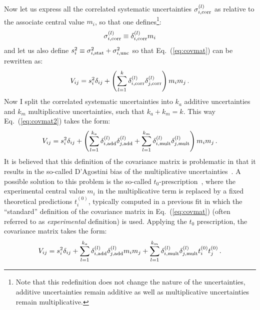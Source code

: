 \documentclass[10pt,a4paper]{article}
\begin{document}
Now let us express all the correlated systematic uncertainties
$\sigma_{i,\rm corr}^{(l)}$ as relative to the associate central value
$m_i$, so that one defines\footnote{Note that this redefinition does
  not change the nature of the uncertainties, additive uncertainties
  remain additive as well as multiplicative uncertainties remain
  multiplicative.}:
\begin{equation}
\sigma_{i,\rm corr}^{(l)}\equiv  \delta_{i,\rm corr}^{(l)} m_i
\end{equation}
and let us also define
$s_i^2\equiv \sigma_{i,\rm stat}^2 +\sigma_{i,\rm unc}^2$ so that
Eq.~(\ref{eq:covmat}) can be rewritten as:
\begin{equation}\label{eq:covmat2}
  V_{ij}=s_i^2\delta_{ij} + \left(\sum_{l=1}^{k}\delta_{i,\rm
    corr}^{(l)}\delta_{j,\rm
    corr}^{(l)}\right)m_im_j\,.
\end{equation}
Now I split the correlated systematic uncertainties into $k_a$
additive uncertainties and $k_m$ multiplicative uncertainties, such
that $k_a+k_m=k$. This way Eq.~(\ref{eq:covmat2}) takes the form:
\begin{equation}\label{eq:covmat3}
  V_{ij}=s_i^2\delta_{ij} + \left(\sum_{l=1}^{k_a}\delta_{i,\rm
    add}^{(l)}\delta_{j,\rm
    add}^{(l)}+\sum_{l=1}^{k_m}\delta_{i,\rm
    mult}^{(l)}\delta_{j,\rm
    mult}^{(l)}\right)m_im_j\,.
\end{equation}
It is believed that this definition of the covariance matrix is
problematic in that it results in the so-called D'Agostini bias of the
multiplicative uncertainties~\cite{DAgostini:1993arp}. A possible
solution to this problem is the so-called
$t_0$-prescription~\cite{Ball:2009qv}, where the experimental central
value $m_i$ in the multiplicative term is replaced by a fixed
theoretical predictions $t_i^{(0)}$, typically computed in a previous
fit in which the ``standard'' definition of the covariance matrix in
Eq.~(\ref{eq:covmat}) (often referred to as \textit{experimental}
definition) is used. Applying the $t_0$ prescription, the covariance
matrix takes the form:
\begin{equation}\label{eq:covmat4}
  V_{ij}=s_i^2\delta_{ij} + \sum_{l=1}^{k_a}\delta_{i,\rm
    add}^{(l)}\delta_{j,\rm
    add}^{(l)}m_im_j+\sum_{l=1}^{k_m}\delta_{i,\rm
    mult}^{(l)}\delta_{j,\rm
    mult}^{(l)}t_i^{(0)}t_j^{(0)}\,.
\end{equation}

\end{document}
